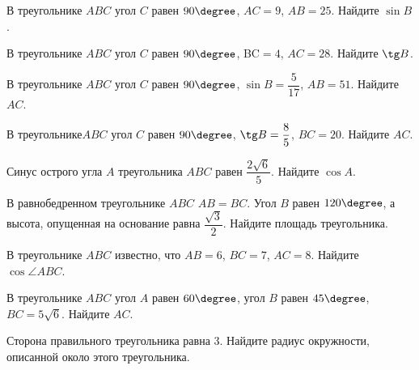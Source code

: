 \begin{homework}[number=1]
	\begin{listofex}
		\item В треугольнике \( ABC \) угол \( C \) равен \( 90\degree \), \( AC=9 \), \( AB=25 \). Найдите \( \sin B \).
		\item В треугольнике \( ABC \) угол \( C \) равен \( 90\degree \), BC\( =4 \), \( AC=28 \). Найдите \( \tg B \).
		\item В треугольнике \( ABC \) угол \( C \) равен \( 90\degree \), \( \sin B=\dfrac{5}{17} \), \( AB=51 \). Найдите \( AC \).
		\item В треугольнике\( ABC \) угол \( C \) равен \( 90\degree \), \( \tg B=\dfrac{8}{5} \), \( BC=20 \). Найдите \( AC \).
		\item Синус острого угла \( A \) треугольника \( ABC \) равен \( \dfrac{2\sqrt{6}}{5} \). Найдите \( \cos A \).
		\item В равнобедренном треугольнике \( ABC \) \( AB=BC \). Угол \( B \) равен \( 120\degree \), а высота, опущенная на основание равна \( \dfrac{\sqrt{3}}{2} \). Найдите площадь треугольника.
		\item В треугольнике \( ABC \) известно, что \( AB=6 \), \( BC=7 \), \( AC=8 \). Найдите \( \cos\angle ABC \).
		\item В треугольнике \( ABC \) угол \( A \) равен \( 60\degree \), угол \( B \) равен \( 45\degree \), \( BC=5\sqrt{6} \). Найдите \( AC \).
		\item Сторона правильного треугольника равна \( 3 \). Найдите радиус окружности, описанной около этого треугольника.
	\end{listofex}
\end{homework}

